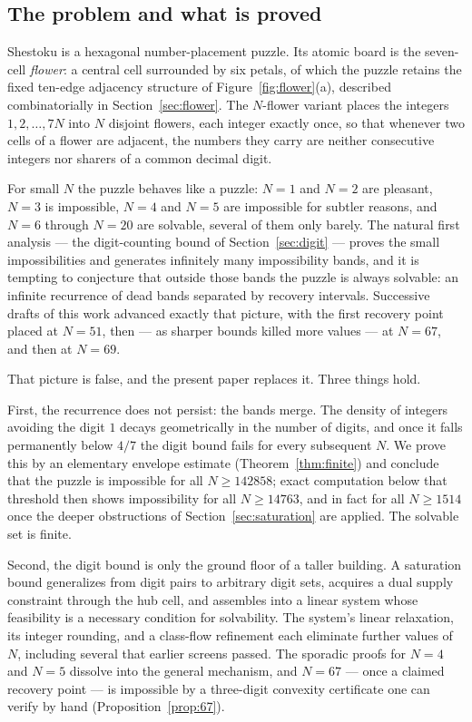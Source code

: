 \documentclass[11pt]{article}
\theoremstyle{definition}
\theoremstyle{remark}
\begin{document}
\subsection*{The problem and what is proved}

Shestoku is a hexagonal number-placement puzzle. Its atomic board is the seven-cell \emph{flower}: a central cell surrounded by six petals, of which the puzzle retains the fixed ten-edge adjacency structure of Figure~\ref{fig:flower}(a), described combinatorially in Section~\ref{sec:flower}. The $N$-flower variant places the integers $1,2,\dots,7N$ into $N$ disjoint flowers, each integer exactly once, so that whenever two cells of a flower are adjacent, the numbers they carry are neither consecutive integers nor sharers of a common decimal digit.

For small $N$ the puzzle behaves like a puzzle: $N=1$ and $N=2$ are pleasant, $N=3$ is impossible, $N=4$ and $N=5$ are impossible for subtler reasons, and $N=6$ through $N=20$ are solvable, several of them only barely. The natural first analysis --- the digit-counting bound of Section~\ref{sec:digit} --- proves the small impossibilities and generates infinitely many impossibility bands, and it is tempting to conjecture that outside those bands the puzzle is always solvable: an infinite recurrence of dead bands separated by recovery intervals. Successive drafts of this work advanced exactly that picture, with the first recovery point placed at $N=51$, then --- as sharper bounds killed more values --- at $N=67$, and then at $N=69$.

That picture is false, and the present paper replaces it. Three things hold.

First, the recurrence does not persist: the bands merge. The density of integers avoiding the digit $1$ decays geometrically in the number of digits, and once it falls permanently below $4/7$ the digit bound fails for every subsequent $N$. We prove this by an elementary envelope estimate (Theorem~\ref{thm:finite}) and conclude that the puzzle is impossible for all $N\ge 142858$; exact computation below that threshold then shows impossibility for all $N \ge 14763$, and in fact for all $N\ge 1514$ once the deeper obstructions of Section~\ref{sec:saturation} are applied. The solvable set is finite.

Second, the digit bound is only the ground floor of a taller building. A saturation bound generalizes from digit pairs to arbitrary digit sets, acquires a dual supply constraint through the hub cell, and assembles into a linear system whose feasibility is a necessary condition for solvability. The system's linear relaxation, its integer rounding, and a class-flow refinement each eliminate further values of $N$, including several that earlier screens passed. The sporadic proofs for $N=4$ and $N=5$ dissolve into the general mechanism, and $N=67$ --- once a claimed recovery point --- is impossible by a three-digit convexity certificate one can verify by hand (Proposition~\ref{prop:67}).
\end{document}
